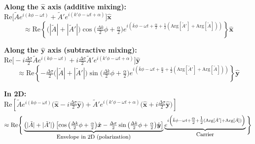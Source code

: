 \noindent
\textbf{Along the $\hat{\boldsymbol{x}}$ axis (additive mixing):} \\[2pt]
\noindent
$\text{Re}\big[ \tilde{A} e^{i(k\phi-\omega t)} + \tilde{A}' e^{i(k'\phi-\omega t+\alpha)} \big] \hat{\boldsymbol{x}}$
\vspace{-0.6em}
\begin{equation*}
\approx \text{Re} \left\{ \big( |\tilde{A}| + |\tilde{A}'| \big) \cos \big( \tfrac{\Delta k}{2} \phi + \tfrac{\alpha}{2} \big) e^{i \left( \bar{k}\phi - \omega t + \tfrac{\alpha}{2} + \tfrac{1}{2} (\text{Arg}[\tilde{A}'] + \text{Arg}[\tilde{A}]) \right)} \right\} \hat{\boldsymbol{x}}
\end{equation*}

\noindent
\textbf{Along the $\hat{\boldsymbol{y}}$ axis (subtractive mixing):} \\[2pt]
\noindent
$\text{Re}\big[ - i \tfrac{\Delta \sigma}{2} \tilde{A} e^{i(k\phi-\omega t)} + i \tfrac{\Delta \sigma}{2} \tilde{A}' e^{i(k'\phi-\omega t+\alpha)} \big] \hat{\boldsymbol{y}}$
\vspace{-0.6em}
\begin{equation*}
\approx \text{Re} \left\{ -\tfrac{\Delta \sigma}{2} \big( |\tilde{A}| + |\tilde{A}'| \big) \sin \big( \tfrac{\Delta k}{2} \phi + \tfrac{\alpha}{2} \big) e^{i \left( \bar{k}\phi - \omega t + \tfrac{\alpha}{2} + \tfrac{1}{2} (\text{Arg}[\tilde{A}'] + \text{Arg}[\tilde{A}]) \right)} \right\} \hat{\boldsymbol{y}}
\end{equation*}

\noindent
\textbf{In 2D:} \\[2pt]
\noindent
$\text{Re} \left[ \tilde{A} e^{i(k\phi-\omega t)} \big( \hat{\boldsymbol{x}} - i \tfrac{\Delta \sigma}{2} \hat{\boldsymbol{y}} \big) + \tilde{A}' e^{i(k'\phi-\omega t+\alpha)} \big( \hat{\boldsymbol{x}} + i \tfrac{\Delta \sigma}{2} \hat{\boldsymbol{y}} \big) \right]$
\vspace{-0.6em}
\begin{equation*}
\approx \text{Re} \Bigg\{ \underbrace{\big( |\tilde{A}| + |\tilde{A}'| \big) \left[ \cos \big( \tfrac{\Delta k}{2} \phi + \tfrac{\alpha}{2} \big) \hat{\boldsymbol{x}} - \tfrac{\Delta \sigma}{2} \sin \big( \tfrac{\Delta k}{2} \phi + \tfrac{\alpha}{2} \big) \hat{\boldsymbol{y}} \right]}_{\text{\small Envelope in 2D (polarization)}} \underbrace{e^{i \left( \bar{k}\phi - \omega t + \tfrac{\alpha}{2} + \tfrac{1}{2} (\text{Arg}[\tilde{A}'] + \text{Arg}[\tilde{A}]) \right)}}_{\text{\small Carrier}} \Bigg\}
\end{equation*}

